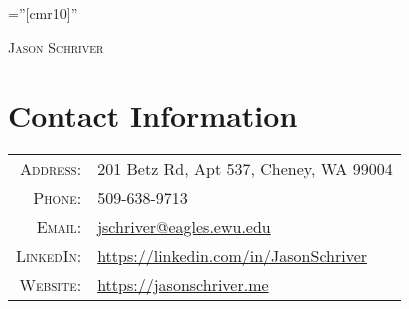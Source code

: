 \documentclass[a4paper,10pt]{article}
\begin{document}

\pagestyle{empty} %

\font\fb=''[cmr10]'' %

{\begin{center}
\textsc		{\Large Jason Schriver}
\end{center}}

\section{Contact Information}
\begin{tabular}{rl}
    \textsc{Address:}   & 201 Betz Rd, Apt 537, Cheney, WA 99004 \\
    \textsc{Phone:}     & 509-638-9713\\
    \textsc{Email:}     & \href{mailto:jschriver@eagles.ewu.edu}{jschriver@eagles.ewu.edu}\\
    \textsc{LinkedIn:}  & \href{https://linkedin.com/in/JasonSchriver}{https://linkedin.com/in/JasonSchriver}\\
    \textsc{Website:}   & \href{https://jasonschriver.me}{https://jasonschriver.me}
\end{tabular}

\end{document}
